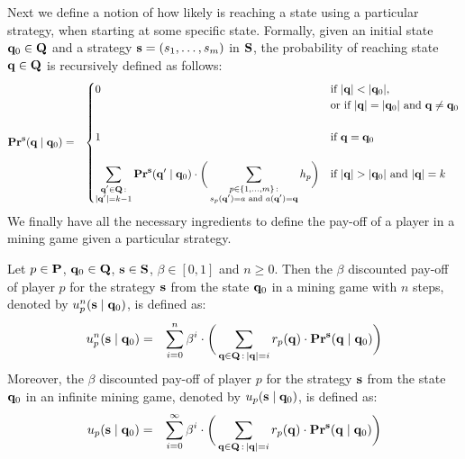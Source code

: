 \documentclass{article}
\begin{document}
Next we define a notion of how likely is reaching a state using a particular strategy, when starting at some specific state. Formally, given an initial state $\mathbf{q}_0 \in \mathbf{Q}$ and a strategy $\mathbf{s} = (s_1, \ldots, s_m)$ in $\mathbf{S}$, 
the probability of reaching state $\mathbf{q} \in \mathbf{Q}$ is recursively defined as follows:
\begin{eqnarray*}
\mathbf{Pr}^{\mathbf{s}}(\mathbf{q} \mid \mathbf{q}_0) & = &
\begin{cases}
0 & \text{if } |\mathbf{q}| < |\mathbf{q}_0|,\\
& \text{or if }  |\mathbf{q}| = |\mathbf{q}_0| \text{ and } \mathbf{q} \neq \mathbf{q}_0\\
&\\
1 & \text{if } \mathbf{q} =  \mathbf{q}_0\\
& \\
{\displaystyle \sum_{\substack{\mathbf{q}' \in \mathbf{Q} \,:\\ |\mathbf{q}'| = k-1}} \mathbf{Pr}^{\mathbf{s}}(\mathbf{q}' \mid \mathbf{q}_0) \cdot \bigg(\sum_{\substack{p \in \{1, \ldots, m\} \,: \\ s_p(\mathbf{q}') = a \text{ and } a(\mathbf{q}') = \mathbf{q}}} h_p\bigg)}
 & \text{if } |\mathbf{q}| > |\mathbf{q}_0| \text{ and } |\mathbf{q}| = k
\end{cases}
\end{eqnarray*}
We finally have all the necessary ingredients to define the pay-off of a player in a mining game given a particular strategy.

\begin{mydef}
Let $p \in \mathbf{P}$, $\mathbf{q}_0 \in \mathbf{Q}$, $\mathbf{s} \in \mathbf{S}$, $\beta \in [0,1]$ and $n \geq 0$. Then the $\beta$ discounted pay-off of player $p$ for the strategy $\mathbf{s}$ from the state $\mathbf{q}_0$ in a mining game with $n$ steps, denoted by $u_p^n(\mathbf{s} \mid \mathbf{q}_0)$, is defined as:
\begin{eqnarray*}
u_p^n(\mathbf{s} \mid \mathbf{q}_0) & = & \sum_{i=0}^{n}\beta^{i} \cdot  \bigg(\sum_{\mathbf{q} \in \mathbf{Q} \,:\, |\mathbf{q}| = i} r_p(\mathbf{q}) \cdot 
\mathbf{Pr}^{\mathbf{s}}(\mathbf{q} \mid \mathbf{q}_0)\bigg)
\end{eqnarray*}
Moreover, the $\beta$ discounted pay-off of player $p$ for the strategy $\mathbf{s}$ from the state $\mathbf{q}_0$ in an infinite mining game, denoted by $u_p(\mathbf{s} \mid \mathbf{q}_0)$, is defined as:
\begin{eqnarray*}
u_p(\mathbf{s} \mid \mathbf{q}_0) & = & \sum_{i=0}^{\infty}\beta^{i} \cdot  \bigg(\sum_{\mathbf{q} \in \mathbf{Q} \,:\, |\mathbf{q}| = i} r_p(\mathbf{q}) \cdot 
\mathbf{Pr}^{\mathbf{s}}(\mathbf{q} \mid \mathbf{q}_0)\bigg)
\end{eqnarray*}
\end{mydef}
\end{document}
